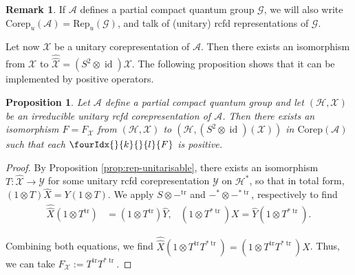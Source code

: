\documentclass[10pt]{article}
\DeclareMathOperator{\id}{id}
\DeclareMathOperator{\tr}{\mathrm{tr}}
\newcommand{\dual}[1]{#1^{*}}
\newcommand{\dualop}[1]{#1^{\tr}}
\newcommand{\dualco}[1]{\hat{#1}}
\newcommand{\Corep}{\mathrm{Corep}}
\newcommand{\Hsp}{\mathcal{H}}
\newcommand{\Rep}{\mathrm{Rep}}
\newcommand{\Gr}[5]{\fourIdx{#2}{#4}{#3}{#5}{#1}}%
\newcommand{\Gru}[3]{\Gr{#1}{}{}{#2}{#3}}
\newtheorem{Prop}[Theorem]{Proposition}
\theoremstyle{definition}
\newtheorem{Rem}[Theorem]{Remark}
\numberwithin{equation}{section}
\begin{document}
\begin{Rem}If $\mathscr{A}$ defines a partial compact quantum group $\mathscr{G}$, we will also write $\Corep_u(\mathscr{A})= \Rep_u(\mathscr{G})$, and talk of (unitary) rcfd representations of $\mathscr{G}$.
 \end{Rem}  
   
Let now $\mathscr{X}$ be a unitary corepresentation of $\mathscr{A}$. Then there exists an isomorphism from $\mathscr{X}$ to $\dualco{\dualco{\mathscr{X}}} = (S^2\otimes \id)\mathscr{X}$. The following proposition shows that it can be implemented by positive operators.

\begin{Prop} \label{prop:rep-unitary-bidual}
  Let $\mathscr{A}$ define a partial compact quantum group and let
  $(\Hsp,\mathscr{X})$ be an irreducible unitary rcfd corepresentation of
  $\mathscr{A}$.  Then there exists an isomorphism $F=F_{\mathscr{X}}$
  from $(\Hsp,\mathscr{X})$ to 
  $(\Hsp,(S^{2} \otimes \id)(\mathscr{X}))$ in $\Corep(\mathscr{A})$ such
  that each $\Gru{F}{k}{l}$ is positive.
\end{Prop}
\begin{proof}
 By Proposition \ref{prop:rep-unitarisable}, there exists an
  isomorphism $T \colon \dualco{\mathscr{X}} \to \mathscr{Y}$ for some
  unitary rcfd corepresentation $\mathscr{Y}$ on $\dual{\Hsp}$, so that in total form,
  $(1\otimes T)\dualco{X} = Y(1 \otimes T)$.
We  apply   $S \otimes -^{\tr}$ and $-^{*} \otimes -^{*\tr}$,
respectively to find 
\begin{align*}
 \dualco{\dualco{X}}(1 \otimes \dualop{T}) &= (1 \otimes
  \dualop{T})\dualco{Y}, & (1 \otimes T^{*\tr})X=\dualco{Y}(1\otimes T^{*\tr}).
\end{align*}

Combining both equations, we
find $\dualco{\dualco{X}}(1 \otimes \dualop{T}T^{*\tr})=(1 \otimes
\dualop{T}T^{*\tr})X$. Thus, we can take
$F_{\mathscr{X}}:=\dualop{T}T^{*\tr}$.
\end{proof}
\end{document}
